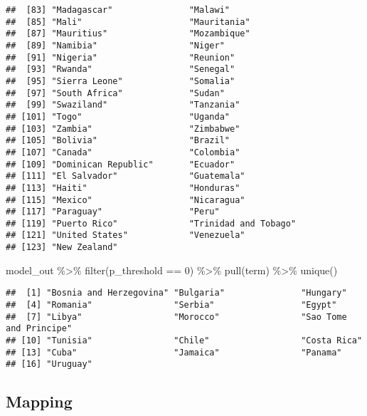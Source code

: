 \documentclass[
]{book}
\newenvironment{Shaded}{\begin{snugshade}}{\end{snugshade}}
\newcommand{\DecValTok}[1]{\textcolor[rgb]{0.00,0.00,0.81}{#1}}
\newcommand{\FunctionTok}[1]{\textcolor[rgb]{0.00,0.00,0.00}{#1}}
\newcommand{\NormalTok}[1]{#1}
\newcommand{\SpecialCharTok}[1]{\textcolor[rgb]{0.00,0.00,0.00}{#1}}
\begin{document}
\begin{verbatim}
##  [83] "Madagascar"               "Malawi"                  
##  [85] "Mali"                     "Mauritania"              
##  [87] "Mauritius"                "Mozambique"              
##  [89] "Namibia"                  "Niger"                   
##  [91] "Nigeria"                  "Reunion"                 
##  [93] "Rwanda"                   "Senegal"                 
##  [95] "Sierra Leone"             "Somalia"                 
##  [97] "South Africa"             "Sudan"                   
##  [99] "Swaziland"                "Tanzania"                
## [101] "Togo"                     "Uganda"                  
## [103] "Zambia"                   "Zimbabwe"                
## [105] "Bolivia"                  "Brazil"                  
## [107] "Canada"                   "Colombia"                
## [109] "Dominican Republic"       "Ecuador"                 
## [111] "El Salvador"              "Guatemala"               
## [113] "Haiti"                    "Honduras"                
## [115] "Mexico"                   "Nicaragua"               
## [117] "Paraguay"                 "Peru"                    
## [119] "Puerto Rico"              "Trinidad and Tobago"     
## [121] "United States"            "Venezuela"               
## [123] "New Zealand"
\end{verbatim}

\begin{Shaded}
\begin{Highlighting}[]
\NormalTok{model\_out }\SpecialCharTok{\%\textgreater{}\%} \FunctionTok{filter}\NormalTok{(p\_threshold }\SpecialCharTok{==} \DecValTok{0}\NormalTok{) }\SpecialCharTok{\%\textgreater{}\%} \FunctionTok{pull}\NormalTok{(term) }\SpecialCharTok{\%\textgreater{}\%} \FunctionTok{unique}\NormalTok{()}
\end{Highlighting}
\end{Shaded}

\begin{verbatim}
##  [1] "Bosnia and Herzegovina" "Bulgaria"               "Hungary"               
##  [4] "Romania"                "Serbia"                 "Egypt"                 
##  [7] "Libya"                  "Morocco"                "Sao Tome and Principe" 
## [10] "Tunisia"                "Chile"                  "Costa Rica"            
## [13] "Cuba"                   "Jamaica"                "Panama"                
## [16] "Uruguay"
\end{verbatim}

\hypertarget{mapping}{%
\subsection{Mapping}\label{mapping}}
\end{document}
